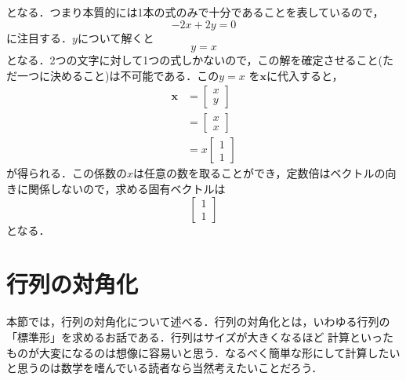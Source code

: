 \documentclass[a4paper,12pt,autodetect-engine,dvipdfmx]{jsarticle}
\theoremstyle{definition}
\begin{document}
となる．つまり本質的には1本の式のみで十分であることを表しているので，
\begin{equation*}
    -2x + 2y = 0
\end{equation*}
に注目する．$y$について解くと
\begin{equation*}
    y = x
\end{equation*}
となる．2つの文字に対して1つの式しかないので，この解を確定させること(ただ一つに決めること)は不可能である．この$y = x$
を$\bm{x}$に代入すると，
\begin{align*}
    \bm{x}&=
    \begin{bmatrix}
        x\\
        y
    \end{bmatrix}\\
    &=
    \begin{bmatrix}
        x\\
        x
    \end{bmatrix}\\
    &=
    x
    \begin{bmatrix}
        1\\
        1
    \end{bmatrix}
\end{align*}
が得られる．この係数の$x$は任意の数を取ることができ，定数倍はベクトルの向きに関係しないので，求める固有ベクトルは
\begin{equation*}
    \begin{bmatrix}
        1\\
        1
    \end{bmatrix}
\end{equation*}
となる．

\section{行列の対角化}
本節では，行列の対角化について述べる．行列の対角化とは，いわゆる行列の「標準形」を求めるお話である．行列はサイズが大きくなるほど
計算といったものが大変になるのは想像に容易いと思う．なるべく簡単な形にして計算したいと思うのは数学を嗜んでいる読者なら当然考えたいことだろう．
\end{document}
